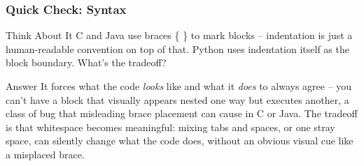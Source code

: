 %
%


\begin{frame}[fragile]\frametitle{Quick Check: Syntax}
\begin{block}{Think About It}
C and Java use braces \{ \} to mark blocks -- indentation is just a human-readable convention on top of that. Python uses indentation itself as the block boundary. What's the tradeoff?
\end{block}
\pause
\begin{block}{Answer}
It forces what the code \emph{looks} like and what it \emph{does} to always agree -- you can't have a block that visually appears nested one way but executes another, a class of bug that misleading brace placement can cause in C or Java. The tradeoff is that whitespace becomes meaningful: mixing tabs and spaces, or one stray space, can silently change what the code does, without an obvious visual cue like a misplaced brace.
\end{block}
\end{frame}
